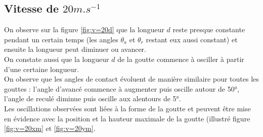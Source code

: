 \documentclass[french]{article}
\begin{document}
\newpage
\subsection{Vitesse de $20m.s^{-1}$}

On observe sur la figure \ref{fig:v=20d} que la longueur $d$ reste presque constante pendant un certain temps (les angles $\theta_{a}$ et $\theta_{r}$ restant eux aussi constant) et ensuite la longueur peut diminuer ou avancer.\\

On constate aussi que la longueur $d$ de la goutte commence à osciller à partir d'une certaine longueur.\\

On observe que les angles de contact évoluent de manière similaire pour toutes les gouttes : l'angle d'avancé commence à augmenter puis oscille autour de \ang{50}, l'angle de reculé diminue puis oscille aux alentours de \ang{5}.\\

Les oscillations observées sont liées à la forme de la goutte et peuvent être mise en évidence avec la position et la hauteur maximale de la goutte (illustré figure \ref{fig:v=20xm} et \ref{fig:v=20ym}.\\
\end{document}
